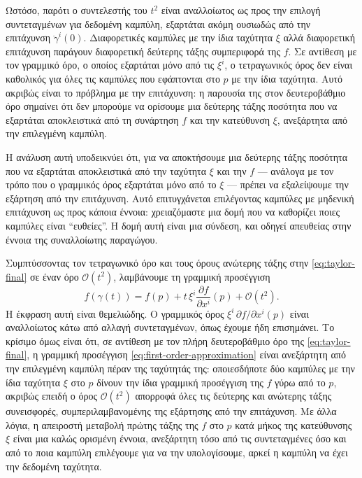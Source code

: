 \documentclass[11pt,a4paper,twoside,openright]{book}
\begin{document}
Ωστόσο, παρότι ο συντελεστής του $t^2$ είναι αναλλοίωτος ως προς την επιλογή συντεταγμένων για δεδομένη καμπύλη, εξαρτάται ακόμη ουσιωδώς από την επιτάχυνση $\ddot{\gamma}^i(0)$. Διαφορετικές καμπύλες με την ίδια ταχύτητα $\xi$ αλλά διαφορετική επιτάχυνση παράγουν διαφορετική δεύτερης τάξης συμπεριφορά της $f$. Σε αντίθεση με τον γραμμικό όρο, ο οποίος εξαρτάται μόνο από τις $\xi^i$, ο τετραγωνικός όρος δεν είναι καθολικός για όλες τις καμπύλες που εφάπτονται στο $p$ με την ίδια ταχύτητα. Αυτό ακριβώς είναι το πρόβλημα με την επιτάχυνση: η παρουσία της στον δευτεροβάθμιο όρο σημαίνει ότι δεν μπορούμε να ορίσουμε μια δεύτερης τάξης ποσότητα που να εξαρτάται αποκλειστικά από τη συνάρτηση $f$ και την κατεύθυνση $\xi$, ανεξάρτητα από την επιλεγμένη καμπύλη.

Η ανάλυση αυτή υποδεικνύει ότι, για να αποκτήσουμε μια δεύτερης τάξης ποσότητα που να εξαρτάται αποκλειστικά από την ταχύτητα $\xi$ και την $f$ --- ανάλογα με τον τρόπο που ο γραμμικός όρος εξαρτάται μόνο από το $\xi$ --- πρέπει να εξαλείψουμε την εξάρτηση από την επιτάχυνση. Αυτό επιτυγχάνεται επιλέγοντας καμπύλες με μηδενική επιτάχυνση ως προς κάποια έννοια: χρειαζόμαστε μια δομή που να καθορίζει ποιες καμπύλες είναι ``ευθείες''. Η δομή αυτή είναι μια σύνδεση, και οδηγεί απευθείας στην έννοια της συναλλοίωτης παραγώγου.

Συμπτύσσοντας τον τετραγωνικό όρο και τους όρους ανώτερης τάξης στην \eqref{eq:taylor-final} σε έναν όρο $\mathcal{O}(t^2)$, λαμβάνουμε τη γραμμική προσέγγιση
\begin{equation}
f(\gamma(t)) = f(p) + t \, \xi^i \frac{\partial f}{\partial x^i}(p) + \mathcal{O}(t^2).
\label{eq:first-order-approximation}
\end{equation}
Η έκφραση αυτή είναι θεμελιώδης. Ο γραμμικός όρος $\xi^i \, \partial f / \partial x^i(p)$ είναι αναλλοίωτος κάτω από αλλαγή συντεταγμένων, όπως έχουμε ήδη επισημάνει. Το κρίσιμο όμως είναι ότι, σε αντίθεση με τον πλήρη δευτεροβάθμιο όρο της \eqref{eq:taylor-final}, η γραμμική προσέγγιση \eqref{eq:first-order-approximation} είναι ανεξάρτητη από την επιλεγμένη καμπύλη πέραν της ταχύτητάς της: οποιεσδήποτε δύο καμπύλες με την ίδια ταχύτητα $\xi$ στο $p$ δίνουν την ίδια γραμμική προσέγγιση της $f$ γύρω από το $p$, ακριβώς επειδή ο όρος $\mathcal{O}(t^2)$ απορροφά όλες τις δεύτερης και ανώτερης τάξης συνεισφορές, συμπεριλαμβανομένης της εξάρτησης από την επιτάχυνση. Με άλλα λόγια, η απειροστή μεταβολή πρώτης τάξης της $f$ στο $p$ κατά μήκος της κατεύθυνσης $\xi$ είναι μια καλώς ορισμένη έννοια, ανεξάρτητη τόσο από τις συντεταγμένες όσο και από το ποια καμπύλη επιλέγουμε για να την υπολογίσουμε, αρκεί η καμπύλη να έχει την δεδομένη ταχύτητα.
\end{document}
